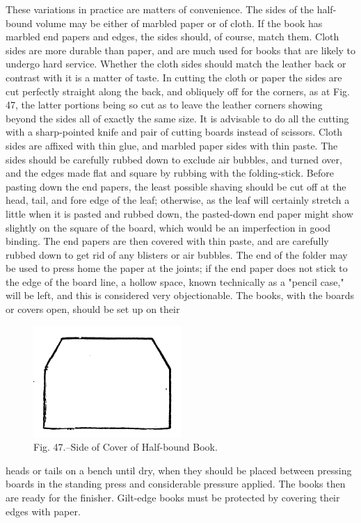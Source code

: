 \documentclass[twoside]{book}
\begin{document}
These variations in practice are matters of convenience.
The sides of the half-bound volume may be either of
marbled paper or of cloth. If the book has
marbled end papers and edges, the sides should, of
course, match them. Cloth sides are more durable
than paper, and are much used for books that are
likely to undergo hard service. Whether the cloth
sides should match the leather back or contrast
with it is a matter of taste. In cutting the cloth
or paper the sides are cut perfectly straight along
the back, and obliquely off for the corners, as at
Fig. 47, the latter portions being so cut as to leave
the leather corners showing beyond the sides all of
exactly the same size. It is advisable to do all the
cutting with a sharp-pointed knife and pair of
cutting boards instead of scissors. Cloth sides are
affixed with thin glue, and marbled paper sides with
thin paste. The sides should be carefully rubbed
down to exclude air bubbles, and turned over, and
the edges made flat and square by rubbing with
the folding-stick. Before pasting down the end
papers, the least possible shaving should be cut
off at the head, tail, and fore edge of the leaf;
otherwise, as the leaf will certainly stretch a little
when it is pasted and rubbed down, the pasted-down
end paper might show slightly on the square of the
board, which would be an imperfection in good
binding. The end papers are then covered with
thin paste, and are carefully rubbed down to get rid
of any blisters or air bubbles. The end of the
\pagebreak
folder may be used to press home the paper at the
joints; if the end paper does not stick to the edge
of the board line, a hollow space, known technically
as a "pencil case," will be left, and this is
considered very objectionable. The books, with the
boards or covers open, should be set up on their
	\begin{figure}[h]
		\centering
		\includegraphics[width=0.5\textwidth]{Figures/_047.png}
		\caption*{Fig. 47.--Side of Cover of Half-bound Book.}
	\end{figure}
heads or tails on a bench until dry, when they should
be placed between pressing boards in the standing
press and considerable pressure applied. The books
then are ready for the finisher. Gilt-edge books
must be protected by covering their edges with
paper.
\end{document}
